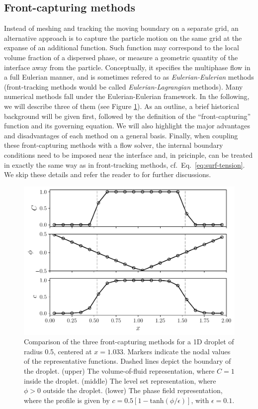 \subsection{Front-capturing methods}

Instead of meshing and tracking the moving boundary on a separate grid, an alternative approach is to capture the particle motion on the same grid at the expanse of an additional function. Such function may correspond to the local volume fraction of a dispersed phase, or measure a geometric quantity of the interface away from the particle.
Conceptually, it specifies the multiphase flow in a full Eulerian manner, and is sometimes refered to as \emph{Eulerian-Eulerian} methods (front-tracking methods would be called \emph{Eulerian-Lagrangian} methods).
Many numerical methods fall under the Eulerian-Eulerian framework. In the following, we will describe three of them (see Figure \ref{fig:front-capture}).
As an outline, a brief historical background will be given first, followed by the definition of the ``front-capturing'' function and its governing equation. We will also highlight the major advantages and disadvantages of each method on a general basis.
Finally, when coupling these front-capturing methods with a flow solver, the internal boundary conditions need to be imposed near the interface and, in pricinple, can be treated in exactly the same way as in front-tracking methods, cf.\ Eq.\ \eqref{eq:surf-tension}. We skip these details and refer the reader to \cite{Brackbill_JCP_1992, Fedkiw_JCP_1999, Lalanne_JCP_2015, Popinet_ARFM_2018, Gibou_Fedkiv_Osher, ICLS} for further discussions.

\begin{figure}%
  \centering
  \includegraphics[width=\columnwidth]{front-capture-comp.pdf}
  \caption{Comparison of the three front-capturing methods for a 1D droplet of radius 0.5, centered at $x=1.033$. Markers indicate the nodal values of the representative functions. Dashed lines depict the boundary of the droplet.
  (upper) The volume-of-fluid representation, where $C=1$ inside the droplet.
  (middle) The level set representation, where $\phi >0$ outside the droplet.
  (lower) The phase field representation, where the profile is given by $c=0.5[1-\mathrm{tanh}(\phi/\epsilon)]$, with $\epsilon=0.1$.}
  \label{fig:front-capture}
\end{figure}


